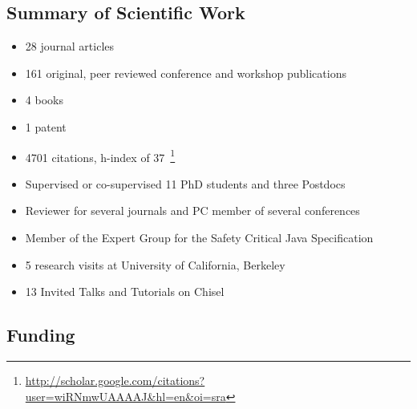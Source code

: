 \documentclass[%
    a4paper,
    11pt, %
    headinclude, footexclude,
    notitlepage,
    headsepline,
    pointlessnumbers,
    ]{scrartcl}
\begin{document}
\subsection*{Summary of Scientific Work}

\begin{itemize}
  \item 28 journal articles
  \item 161 original, peer reviewed conference and workshop
      publications
  \item 4 books
  \item 1 patent
  \item 4701 citations, h-index of 37~\footnote{\url{http://scholar.google.com/citations?user=wiRNmwUAAAAJ&hl=en&oi=sra}}
  \item Supervised or co-supervised 11 PhD students and three Postdocs
  \item Reviewer for several journals and PC member of several
      conferences
  \item Member of the Expert Group for the Safety Critical Java
      Specification
  \item 5 research visits at University of California, Berkeley
  \item 13 Invited Talks and Tutorials on Chisel
\end{itemize}

\subsection*{Funding}
\end{document}
